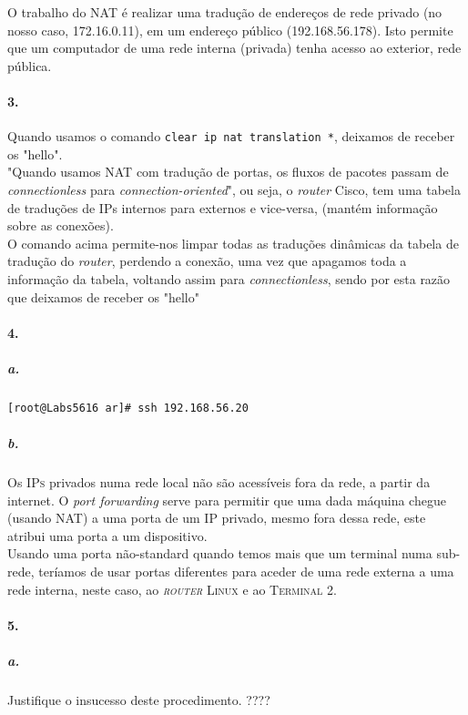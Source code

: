 O trabalho do NAT é realizar uma tradução de endereços de rede privado (no nosso caso, \textsf{172.16.0.11}), em um endereço público (\textsf{192.168.56.178}). Isto permite  que um computador de uma rede interna (privada) tenha acesso ao exterior, rede pública.


\paragraph{3.}
Quando usamos o comando \texttt{clear ip nat translation *}, deixamos de receber os \textsf{"hello"}.\\
"Quando usamos NAT com tradução de portas, os fluxos de pacotes passam de \emph{connectionless} para \emph{connection-oriented}", ou seja, o \textsf{\emph{router} Cisco}, tem uma tabela de traduções de \textsf{IPs} internos para externos e vice-versa, (mantém informação sobre as conexões).\\
O comando acima permite-nos limpar todas as traduções dinâmicas da tabela de tradução do \emph{router}, perdendo a conexão, uma vez que apagamos toda a informação da tabela, voltando assim para \emph{connectionless}, sendo por esta razão que deixamos de receber os \textsf{"hello"}


\paragraph{4.}

\subparagraph{a.}
\begin{verbatim}
[root@Labs5616 ar]# ssh 192.168.56.20
\end{verbatim}


\subparagraph{b.}
Os \textsc{IPs} privados numa rede local não são acessíveis fora da rede, a partir da internet. O \emph{port forwarding} serve para permitir que uma dada máquina chegue (usando NAT) a uma porta de um IP privado, mesmo fora dessa rede, este atribui uma porta a um dispositivo.\\
Usando uma porta não-standard quando temos mais que um terminal numa sub-rede, teríamos de usar portas diferentes para aceder de uma rede externa a uma rede interna, neste caso, ao \textsc{\emph{router} Linux} e ao \textsc{Terminal 2}.


\paragraph{5.}

\subparagraph{a.}

Justifique o insucesso deste procedimento. ????


